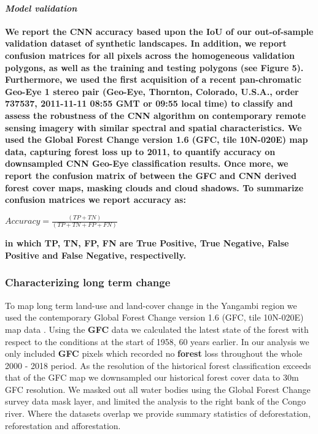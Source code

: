 \documentclass[remote sensing,article,submit,moreauthors,pdftex]{mdpi}
\begin{document}
\hypertarget{model-validation}{%
\paragraph{\texorpdfstring{\emph{Model
validation}}{Model validation}}\label{model-validation}}

\textbf{We report the CNN accuracy based upon the IoU of our
out-of-sample validation dataset of synthetic landscapes. In addition,
we report confusion matrices for all pixels across the homogeneous
validation polygons, as well as the training and testing polygons (see
Figure 5). Furthermore, we used the first acquisition of a recent
pan-chromatic Geo-Eye 1 stereo pair (Geo-Eye, Thornton, Colorado,
U.S.A., order 737537, 2011-11-11 08:55 GMT or 09:55 local time) to
classify and assess the robustness of the CNN algorithm on contemporary
remote sensing imagery with similar spectral and spatial
characteristics. We used the Global Forest Change version 1.6 (GFC, tile
10N-020E) \citep{hansen2013} map data, capturing forest loss up to 2011,
to quantify accuracy on downsampled CNN Geo-Eye classification results.
Once more, we report the confusion matrix of between the GFC and CNN
derived forest cover maps, masking clouds and cloud shadows. To
summarize confusion matrices we report accuracy as:}

\(Accuracy = \frac{(TP + TN)}{(TP + TN + FP + FN)}\)

\textbf{in which TP, TN, FP, FN are True Positive, True Negative, False
Positive and False Negative, respectivelly.}

\hypertarget{characterizing-long-term-change}{%
\subsubsection{Characterizing long term
change}\label{characterizing-long-term-change}}

To map long term land-use and land-cover change in the Yangambi region
we used the contemporary Global Forest Change version 1.6 (GFC, tile
10N-020E) map data \citep{hansen2013}. Using the \textbf{GFC} data we
calculated the latest state of the forest with respect to the conditions
at the start of 1958, 60 years earlier. In our analysis we only included
\textbf{GFC} pixels which recorded no \textbf{forest} loss throughout
the whole 2000 - 2018 period. As the resolution of the historical forest
classification exceeds that of the GFC map we downsampled our historical
forest cover data to 30m GFC resolution. We masked out all water bodies
using the Global Forest Change survey data mask layer, and limited the
analysis to the right bank of the Congo river. Where the datasets
overlap we provide summary statistics of deforestation, reforestation
and afforestation.
\end{document}
